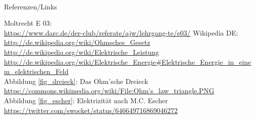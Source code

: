 

\renewcommand{\refname}{Referenzen}

\hypertarget{refs}{}
\textcolor{white}{} \\ %
\Large Referenzen/Links
\footnotesize

\begin{thebibliography}{}
     Moltrecht E 03: \\
    \url{https://www.darc.de/der-club/referate/ajw/lehrgang-te/e03/}
      Wikipedia DE: \\
    \url{http://de.wikipedia.org/wiki/Ohmsches_Gesetz}\\
    \url{http://de.wikipedia.org/wiki/Elektrische_Leistung}\\
    \url{http://de.wikipedia.org/wiki/Elektrische_Energie#Elektrische_Energie_in_einem_elektrischen_Feld}\\
    
      Abbildung \ref{fig_dreieck}: Das Ohm'sche Dreieck\\
	    \url{https://commons.wikimedia.org/wiki/File:Ohm's_law_triangle.PNG}\\
	  Abbildung \ref{fig_escher}: Elektrizität nach M.C. Escher\\
		\url{https://twitter.com/swocket/status/646649716869046272}\\
\end{thebibliography}


